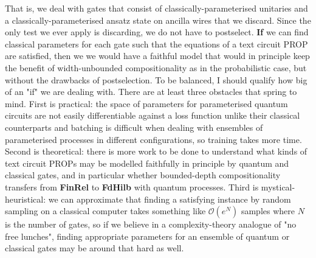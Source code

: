 \begin{fullwidth}
That is, we deal with gates that consist of classically-parameterised unitaries and a classically-parameterised ansatz state on ancilla wires that we discard. Since the only test we ever apply is discarding, we do not have to postselect. \textbf{If} we can find classical parameters for each gate such that the equations of a text circuit PROP are satisfied, then we we would have a faithful model that would in principle keep the benefit of width-unbounded compositionality as in the probabilistic case, but without the drawbacks of postselection. To be balanced, I should qualify how big of an "if" we are dealing with. There are at least three obstacles that spring to mind. First is practical: the space of parameters for parameterised quantum circuits are not easily differentiable against a loss function unlike their classical counterparts and batching is difficult when dealing with ensembles of parameterised processes in different configurations, so training takes more time. Second is theoretical: there is more work to be done to understand what kinds of text circuit PROPs may be modelled faithfully in principle by quantum and classical gates, and in particular whether bounded-depth compositionality transfers from \textbf{FinRel} to \textbf{FdHilb} with quantum processes. Third is mystical-heuristical: we can approximate that finding a satisfying instance by random sampling on a classical computer takes something like $\mathcal{O}(e^N)$ samples where $N$ is the number of gates, so if we believe in a complexity-theory analogue of "no free lunches", finding appropriate parameters for an ensemble of quantum or classical gates may be around that hard as well.


\end{fullwidth}